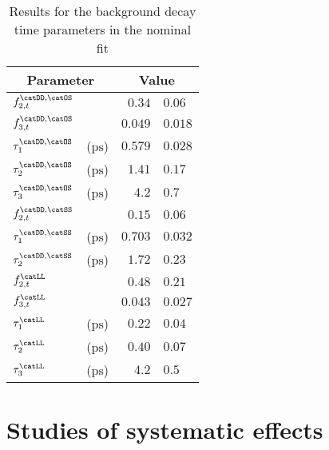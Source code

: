 \begin{table}
  \caption{Results for the background decay time parameters in the nominal fit}
  \label{tab:app:measurement_of_sin2beta:cpv_measurement:results:time:bkg}
  \centering
  \begin{tabular}{llr@{$\,\pm\,$}l}
      \toprule
      \multicolumn{2}{c}{Parameter}       & \multicolumn{2}{c}{Value}                  \\
      \midrule
      $f^{\catDD,\catOS}_{2,t}$   &                       & $0.34$    & $0.06$   \\
      $f^{\catDD,\catOS}_{3,t}$   &                       & $0.049$   & $0.018$  \\
      $\tau^{\catDD,\catOS}_{1}$  & ($\si{\pico\second}$) & $0.579$   & $0.028$  \\
      $\tau^{\catDD,\catOS}_{2}$  & ($\si{\pico\second}$) & $1.41$    & $0.17$   \\
      $\tau^{\catDD,\catOS}_{3}$  & ($\si{\pico\second}$) & $4.2$     & $0.7$    \\
      \midrule
      $f^{\catDD,\catSS}_{2,t}$   &                       & $0.15$    & $0.06$   \\
      $\tau^{\catDD,\catSS}_{1}$  & ($\si{\pico\second}$) & $0.703$   & $0.032$   \\
      $\tau^{\catDD,\catSS}_{2}$  & ($\si{\pico\second}$) & $1.72$    & $0.23$   \\
      \midrule
      $f^{\catLL}_{2,t}$          &                       & $0.48$    & $0.21$   \\
      $f^{\catLL}_{3,t}$          &                       & $0.043$   & $0.027$  \\
      $\tau^{\catLL}_{1}$         & ($\si{\pico\second}$) & $0.22$    & $0.04$  \\
      $\tau^{\catLL}_{2}$         & ($\si{\pico\second}$) & $0.40$    & $0.07$   \\
      $\tau^{\catLL}_{3}$         & ($\si{\pico\second}$) & $4.2$     & $0.5$    \\
      \bottomrule
    \end{tabular}
\end{table}

\clearpage
\section{Studies of systematic effects}
\label{sec:app:measurement_of_sin2beta:systematics}

